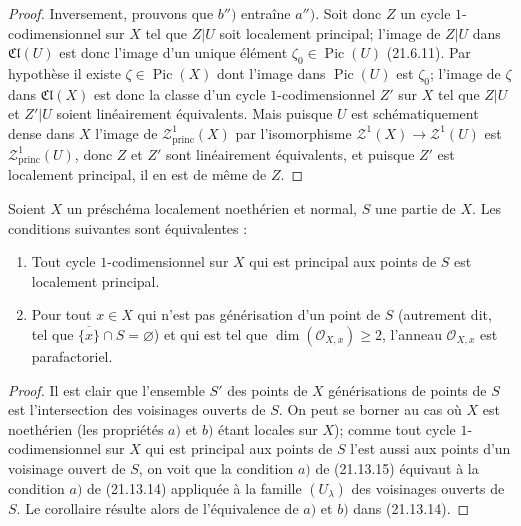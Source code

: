 \begin{proof}
Inversement, prouvons que $b'')$ entraîne $a'')$. Soit donc $Z$ un cycle
$1$-codimensionnel sur $X$ tel que $Z|U$ soit localement principal; l'image de $Z|U$
dans $\mathfrak{Cl}(U)$ est donc l'image d'un unique élément
$\zeta_0\in\operatorname{Pic}(U)$ (21.6.11). Par hypothèse il existe
$\zeta\in\operatorname{Pic}(X)$ dont l'image dans $\operatorname{Pic}(U)$ est
$\zeta_0$; l'image de $\zeta$ dans $\mathfrak{Cl}(X)$ est donc la classe d'un cycle
$1$-codimensionnel $Z'$ sur $X$ tel que $Z|U$ et $Z'|U$ soient linéairement
équivalents. Mais puisque $U$ est schématiquement dense dans $X$ l'image de
$\mathscr Z^1_{\mathrm{princ}}(X)$ par l'isomorphisme
$\mathscr Z^1(X)\to\mathscr Z^1(U)$ est $\mathscr Z^1_{\mathrm{princ}}(U)$, donc $Z$
et $Z'$ sont linéairement équivalents, et puisque $Z'$ est localement principal, il
en est de même de $Z$.
\end{proof}

\begin{corollary}[21.13.15]
\label{IV.21.13.15}
Soient $X$ un préschéma localement noethérien et normal, $S$ une partie de $X$. Les
conditions suivantes sont équivalentes :
\begin{enumerate}[label=\emph{\alph*)}]
  \item Tout cycle $1$-codimensionnel sur $X$ qui est principal aux points de $S$ est
  localement principal.
  \item Pour tout $x\in X$ qui n'est pas générisation d'un point de $S$ (autrement
  dit, tel que $\overline{\{x\}}\cap S=\varnothing$) et qui est tel que
  $\dim(\mathcal O_{X,x})\geq2$, l'anneau $\mathcal O_{X,x}$ est parafactoriel.
\end{enumerate}
\end{corollary}

\begin{proof}
Il est clair que l'ensemble $S'$ des points de $X$ générisations de points de $S$ est
l'intersection des voisinages ouverts de $S$. On peut se borner au cas où $X$ est
noethérien (les propriétés $a)$ et $b)$ étant locales sur $X$); comme tout cycle
$1$-codimensionnel sur $X$ qui est principal aux points de $S$ l'est aussi aux points
d'un voisinage ouvert de $S$, on voit que la condition $a)$ de (21.13.15) équivaut à
la condition $a)$ de (21.13.14) appliquée à la famille $(U_\lambda)$ des voisinages
ouverts de $S$. Le corollaire résulte alors de l'équivalence de $a)$ et $b)$ dans
(21.13.14).
\end{proof}

